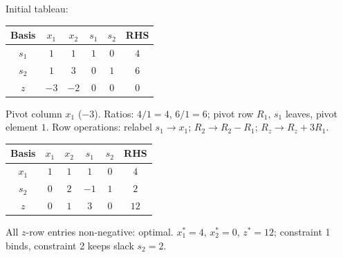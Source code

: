 \begin{solutions}
  \item Initial tableau:
        \begin{center}
        \begin{tabular}{c|cccc|c}
        Basis & $x_1$ & $x_2$ & $s_1$ & $s_2$ & RHS\\
        \hline
        $s_1$ & $1$ & $1$ & $1$ & $0$ & $4$\\
        $s_2$ & $1$ & $3$ & $0$ & $1$ & $6$\\
        \hline
        $z$ & $-3$ & $-2$ & $0$ & $0$ & $0$\\
        \end{tabular}
        \end{center}
        Pivot column $x_1$ ($-3$). Ratios: $4/1=4$, $6/1=6$; pivot row
        $R_1$, $s_1$ leaves, pivot element $1$. Row operations: relabel
        $s_1\to x_1$; $R_2\to R_2-R_1$; $R_z\to R_z+3R_1$.
        \begin{center}
        \begin{tabular}{c|cccc|c}
        Basis & $x_1$ & $x_2$ & $s_1$ & $s_2$ & RHS\\
        \hline
        $x_1$ & $1$ & $1$ & $1$ & $0$ & $4$\\
        $s_2$ & $0$ & $2$ & $-1$ & $1$ & $2$\\
        \hline
        $z$ & $0$ & $1$ & $3$ & $0$ & $12$\\
        \end{tabular}
        \end{center}
        All $z$-row entries non-negative: optimal. $x_1^{*}=4$,
        $x_2^{*}=0$, $z^{*}=12$; constraint 1 binds, constraint 2 keeps
        slack $s_2=2$.


\end{solutions}
